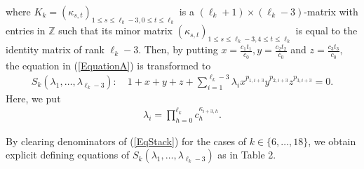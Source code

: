 \documentclass[10pt]{article}
\begin{document}
where $K_k=(\kappa_{s,t})_{1 \leq s \leq \ell_k-3, 0 \leq t \leq \ell_k }$ is a $(\ell_k+1)\times (\ell_k-3)$-matrix with entries in $\mathbb{Z}$ 
such that its minor matrix $(\kappa_{s,t})_{1 \leq s \leq \ell_k-3, 4 \leq t \leq \ell_k }$ is equal to the identity matrix of rank $\ell_k - 3$.
Then, by putting 
$
\displaystyle
x=\frac{c_1 t_1}{c_0},  y=\frac{c_2 t_2}{c_0}$ and $\displaystyle z=\frac{c_3 t_3}{c_0},
$
the equation in (\ref{EquationA}) is transformed to
\begin{align}\label{EqStack}
S_k(\lambda_1,\ldots, \lambda_{\ell_k-3}): \quad 1 + x + y + z + \sum_{i=1}^{\ell_k-3} \lambda_i x^{p_{1,i+3}} y^{p_{2,i+3}} z^{p_{3,i+3}} =0.
\end{align}
Here, we put
\begin{align}\label{lambda}
\lambda_i = \prod_{h=0}^{\ell_k} c_h^{\kappa_{i+3, h}}.
\end{align}


By clearing denominators of (\ref{EqStack})
for the cases of $k\in \{6,\ldots,18\}$, 
we obtain explicit defining equations of $S_k(\lambda_1,\ldots,\lambda_{\ell_k -3})$ as in Table 2.
\end{document}
